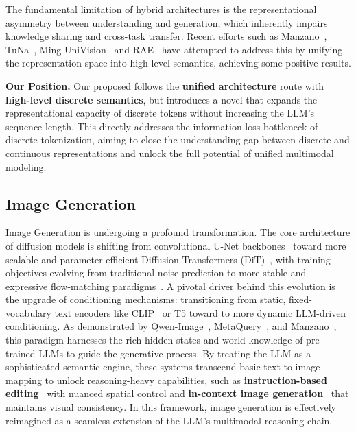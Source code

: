 \documentclass[11pt, a4paper, logo, copyright]{googledeepmind}
\begin{document}
The fundamental limitation of hybrid architectures is the representational asymmetry between understanding and generation, which inherently impairs knowledge sharing and cross-task transfer. Recent efforts such as Manzano~\citep{li2025manzano}, TuNa~\citep{liu2025tuna}, Ming-UniVision~\citep{mingUniVision} and RAE~\citep{tong2026scaling} have attempted to address this by unifying the representation space into high-level semantics, achieving some positive results.

\textbf{Our Position.}
Our proposed  follows the \textbf{unified architecture} route with \textbf{high-level discrete semantics}, but introduces a novel  that expands the representational capacity of discrete tokens without increasing the LLM's sequence length. This directly addresses the information loss bottleneck of discrete tokenization, aiming to close the understanding gap between discrete and continuous representations and unlock the full potential of unified multimodal modeling.

\subsection{Image Generation}

Image Generation is undergoing a profound transformation. The core architecture of diffusion models is shifting from convolutional U-Net backbones~\citep{rombach2022high} toward more scalable and parameter-efficient Diffusion Transformers (DiT)~\citep{peebles2023scalable, team2025zimage}, with training objectives evolving from traditional noise prediction to more stable and expressive flow-matching paradigms~\citep{ma2025janusflow, xie2025sana}. A pivotal driver behind this evolution is the upgrade of conditioning mechanisms: transitioning from static, fixed-vocabulary text encoders like CLIP~\citep{radford2021learning} or T5 toward to more dynamic LLM-driven conditioning. As demonstrated by Qwen-Image~\citep{wang2024qwen2}, MetaQuery~\citep{pan2025transfer}, and Manzano~\citep{li2025manzano}, this paradigm harnesses the rich hidden states and world knowledge of pre-trained LLMs to guide the generative process. By treating the LLM as a sophisticated semantic engine, these systems transcend basic text-to-image mapping to unlock reasoning-heavy capabilities, such as \textbf{instruction-based editing}~\citep{qian2025pico} with nuanced spatial control and \textbf{in-context image generation}~\citep{sun2024generative} that maintains visual consistency. In this framework, image generation is effectively reimagined as a seamless extension of the LLM’s multimodal reasoning chain.
\end{document}
